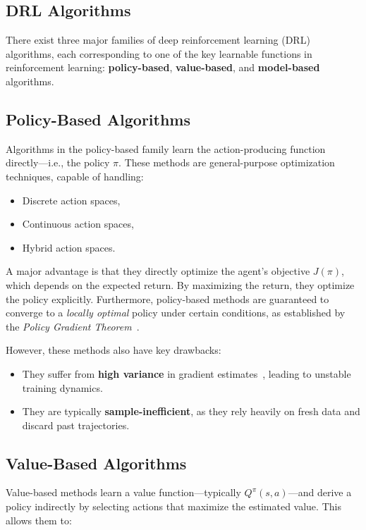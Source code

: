 \documentclass[a4paper,oneside]{book}
\theoremstyle{definition}
\begin{document}
\subsection{DRL Algorithms}
There exist three major families of deep reinforcement learning (DRL) algorithms, each corresponding to one of the key learnable functions in reinforcement learning: \textbf{policy-based}, \textbf{value-based}, and \textbf{model-based} algorithms.

\subsection*{Policy-Based Algorithms}

Algorithms in the policy-based family learn the action-producing function directly—i.e., the policy \( \pi \). These methods are general-purpose optimization techniques, capable of handling:

\begin{itemize}
    \item Discrete action spaces,
    \item Continuous action spaces,
    \item Hybrid action spaces.
\end{itemize}

A major advantage is that they directly optimize the agent’s objective \( J(\pi) \), which depends on the expected return. By maximizing the return, they optimize the policy explicitly. Furthermore, policy-based methods are guaranteed to converge to a \textit{locally optimal} policy under certain conditions, as established by the \textit{Policy Gradient Theorem}~\cite{ref16}.

However, these methods also have key drawbacks:

\begin{itemize}
    \item They suffer from \textbf{high variance} in gradient estimates~\cite{ref17}, leading to unstable training dynamics.
    \item They are typically \textbf{sample-inefficient}, as they rely heavily on fresh data and discard past trajectories.
\end{itemize}

\subsection*{Value-Based Algorithms}

Value-based methods learn a value function—typically \( Q^\pi(s, a) \)—and derive a policy indirectly by selecting actions that maximize the estimated value. This allows them to:
\end{document}
